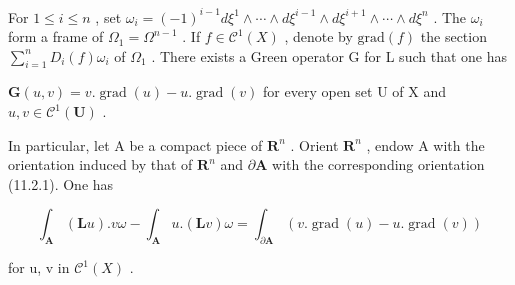 For \(1 \leqslant i \leqslant n\) , set \(\omega_{i} = (-1)^{i-1} d\xi^{1} \wedge \cdots \wedge d\xi^{i-1} \wedge d\xi^{i+1} \wedge \cdots \wedge d\xi^{n}\) . The \(\omega_{i}\) form a frame of \(\Omega_{1} = \Omega^{n-1}\) . If \(f \in \mathcal{C}^{1}(X)\) , denote by \(\text{grad}(f)\) the section \(\sum_{i=1}^{n} D_{i}(f)\omega_{i}\) of \(\Omega_{1}\) . There exists a Green operator G for L such that one has

\(\mathbf{G}(u,v) = v.\operatorname{grad}(u) - u.\operatorname{grad}(v)\) for every open set U of X and \(u,v \in \mathcal{C}^{1}(\mathbf{U})\) .

In particular, let A be a compact piece of \(\mathbf{R}^{n}\) . Orient \(\mathbf{R}^{n}\) , endow A with the orientation induced by that of \(\mathbf{R}^{n}\) and \(\partial\mathbf{A}\) with the corresponding orientation (11.2.1). One has

\[
\int_ {\mathbf {A}} (\mathbf {L} u). v \omega - \int_ {\mathbf {A}} u. (\mathbf {L} v) \omega = \int_ {\partial \mathbf {A}} (v. \operatorname{grad} (u) - u. \operatorname{grad} (v))
\]

for u, v in \(\mathcal{C}^{1}(X)\) .

